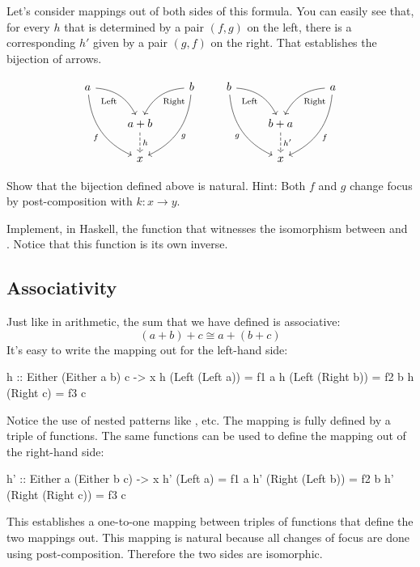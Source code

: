 \documentclass[DaoFP]{subfiles}
\begin{document}
Let's consider mappings out of both sides of this formula. You can easily see that, for every $h$ that is determined by a pair $(f, g)$ on the left, there is a corresponding $h'$ given by a pair $(g, f)$ on the right. That establishes the bijection of arrows.

\[
 \begin{tikzcd}
 a
 \arrow[dr,  bend left, "\text{Left}"']
 \arrow[ddr, bend right, "f"']
 && b
 \arrow[dl, bend right, "\text{Right}"]
 \arrow[ddl, bend left, "g"]
 \\
&a + b
\arrow[d, dashed, "h"]
\\
& x
 \end{tikzcd}
 \qquad
 \begin{tikzcd}
 b
 \arrow[dr,  bend left, "\text{Left}"']
 \arrow[ddr, bend right, "g"']
 && a
 \arrow[dl, bend right, "\text{Right}"]
 \arrow[ddl, bend left, "f"]
 \\
&b + a
\arrow[d, dashed, "h'"]
\\
& x
 \end{tikzcd}
\]

\begin{exercise}
Show that the bijection defined above is natural. Hint: Both $f$ and $g$ change focus by post-composition with $k \colon x \to y$.
\end{exercise}
\begin{exercise}
Implement, in Haskell, the function that witnesses the isomorphism between  and . Notice that this function is its own inverse.
\end{exercise}

\subsection{Associativity}

Just like in arithmetic, the sum that we have defined is associative:
\[(a + b) + c \cong a + (b + c) \]
It's easy to write the mapping out for the left-hand side:
\begin{haskell}
h :: Either (Either a b) c -> x
h (Left (Left a))  = f1 a
h (Left (Right b)) = f2 b
h (Right c)        = f3 c
\end{haskell}
Notice the use of nested patterns like , etc. The mapping is fully defined by a triple of functions. The same functions can be used to define the mapping out of the right-hand side:
\begin{haskell}
h' :: Either a (Either b c) -> x
h' (Left a)          = f1 a
h' (Right (Left b))  = f2 b
h' (Right (Right c)) = f3 c
\end{haskell}
This establishes a one-to-one mapping between triples of functions that define the two mappings out. This mapping is natural because all changes of focus are done using post-composition. Therefore the two sides are isomorphic.
\end{document}
